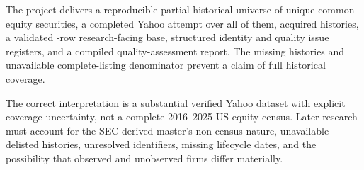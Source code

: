 
The project delivers a reproducible partial historical universe of \IncludedSecurities{} unique common-equity securities, a completed Yahoo attempt over all of them, \YahooSuccess{} acquired histories, a validated \Observations{}-row research-facing base, structured identity and quality issue registers, and a compiled quality-assessment report. The missing \YahooFailed{} histories and unavailable complete-listing denominator prevent a claim of full historical coverage.

The correct interpretation is a substantial verified Yahoo dataset with explicit coverage uncertainty, not a complete 2016--2025 US equity census. Later research must account for the SEC-derived master's non-census nature, unavailable delisted histories, unresolved identifiers, missing lifecycle dates, and the possibility that observed and unobserved firms differ materially.
